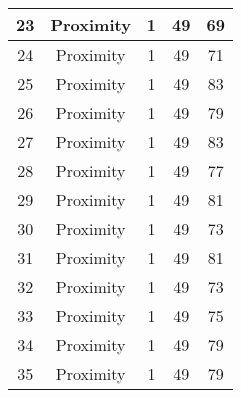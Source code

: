 \documentclass[results.tex]{subfiles}
\begin{document}
\begin{center}
\begin{tabular}{| c || c | c | c | c |}
            \hline
            23                      & Proximity                    & 1                      & 49                      & 69                   \\
            \hline
            24                      & Proximity                    & 1                      & 49                      & 71                   \\
            \hline
            25                      & Proximity                    & 1                      & 49                      & 83                   \\
            \hline
            26                      & Proximity                    & 1                      & 49                      & 79                   \\
            \hline
            27                      & Proximity                    & 1                      & 49                      & 83                   \\
            \hline
            28                      & Proximity                    & 1                      & 49                      & 77                   \\
            \hline
            29                      & Proximity                    & 1                      & 49                      & 81                   \\
            \hline
            30                      & Proximity                    & 1                      & 49                      & 73                   \\
            \hline
            31                      & Proximity                    & 1                      & 49                      & 81                   \\
            \hline
            32                      & Proximity                    & 1                      & 49                      & 73                   \\
            \hline
            33                      & Proximity                    & 1                      & 49                      & 75                   \\
            \hline
            34                      & Proximity                    & 1                      & 49                      & 79                   \\
            \hline
            35                      & Proximity                    & 1                      & 49                      & 79                   \\

\end{tabular}
\end{center}
\end{document}
